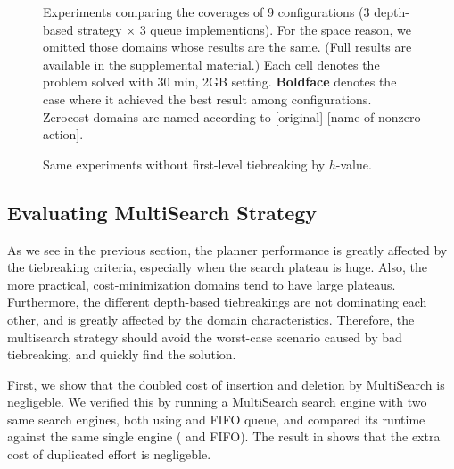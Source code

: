 
\begin{figure}[htb]
 \centering
 
 \caption{Experiments
 comparing the coverages of 9 configurations (3 depth-based strategy
 $\times$ 3 queue implementions). For the space reason, we omitted those
 domains whose results are the same. (Full results are available in the
 supplemental material.) Each cell denotes the problem solved with 30
 min, 2GB setting. \textbf{Boldface} denotes the case where it achieved
 the best result among configurations. Zerocost domains are named
 according to [original]-[name of nonzero action].}
 \label{depth}
\end{figure}

\begin{figure}[htb]
 \centering
 
 \caption{Same experiments without first-level tiebreaking by $h$-value.}
 \label{depth-noh}
\end{figure}


\subsection{Evaluating MultiSearch Strategy}

As we see in the previous section, the planner performance is greatly
affected by the tiebreaking criteria, especially when the search plateau
is huge.
% 
Also, the more practical, cost-minimization domains tend to have large plateaus.
% 
Furthermore, the different depth-based tiebreakings are not dominating
each other, and is greatly affected by the domain characteristics.
% 
Therefore, the multisearch strategy should avoid the
worst-case scenario caused by bad tiebreaking, and quickly find the solution.

First, we show that the doubled cost of insertion and deletion by
MultiSearch is negligeble.  We verified this by running a MultiSearch
search engine with two same search engines, both using \lmcut and FIFO
queue, and compared its runtime against the same single engine (\lmcut
and FIFO). The result in  shows that the extra cost of
duplicated effort is negligeble.

